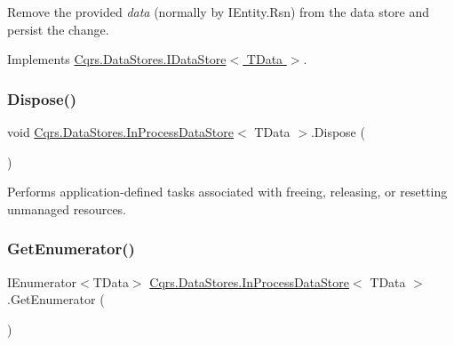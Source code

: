 Remove the provided {\itshape data}  (normally by I\+Entity.\+Rsn) from the data store and persist the change. 



Implements \hyperlink{interfaceCqrs_1_1DataStores_1_1IDataStore_aa7ade96f2f3151d5353cf7bdbb2baec5}{Cqrs.\+Data\+Stores.\+I\+Data\+Store$<$ T\+Data $>$}.

\mbox{\label{classCqrs_1_1DataStores_1_1InProcessDataStore_a220126a1dd0e318197b9c994c313d5fd}} 
\subsubsection{\texorpdfstring{Dispose()}{Dispose()}}
{\footnotesize\ttfamily void \hyperlink{classCqrs_1_1DataStores_1_1InProcessDataStore}{Cqrs.\+Data\+Stores.\+In\+Process\+Data\+Store}$<$ T\+Data $>$.Dispose (\begin{DoxyParamCaption}{ }\end{DoxyParamCaption})}



Performs application-\/defined tasks associated with freeing, releasing, or resetting unmanaged resources. 

\mbox{\label{classCqrs_1_1DataStores_1_1InProcessDataStore_a867c2badec9f0669cf70257f5572b701}} 
\subsubsection{\texorpdfstring{Get\+Enumerator()}{GetEnumerator()}}
{\footnotesize\ttfamily I\+Enumerator$<$T\+Data$>$ \hyperlink{classCqrs_1_1DataStores_1_1InProcessDataStore}{Cqrs.\+Data\+Stores.\+In\+Process\+Data\+Store}$<$ T\+Data $>$.Get\+Enumerator (\begin{DoxyParamCaption}{ }\end{DoxyParamCaption})}



